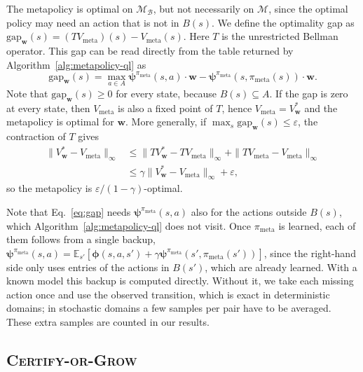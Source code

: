 \documentclass[11pt]{article}
\newcommand{\vphi}{\bm{\phi}}      %
\newcommand{\vpsi}{\bm{\psi}}      %
\begin{document}
The metapolicy is optimal on $\mathcal{M}_{\mathcal{B}}$, but not necessarily on $\mathcal{M}$, since the optimal policy may need an action that is not in $B(s)$. We define the optimality gap as $\mathrm{gap}_{\mathbf{w}}(s) = (T V_{\mathrm{meta}})(s) - V_{\mathrm{meta}}(s)$. Here $T$ is the unrestricted Bellman operator. This gap can be read directly from the table returned by Algorithm~\ref{alg:metapolicy-ql} as 
\begin{equation}\label{eq:gap}
    \mathrm{gap}_{\mathbf{w}}(s) = \max_{a \in A} \vpsi^{\pi_{\mathrm{meta}}}(s,a) \cdot \mathbf{w} - \vpsi^{\pi_{\mathrm{meta}}}(s, \pi_{\mathrm{meta}}(s)) \cdot \mathbf{w}.
\end{equation}
Note that $\mathrm{gap}_{\mathbf{w}}(s) \geq 0$ for every state, because $B(s) \subseteq A$. If the gap is zero at every state, then $V_{\mathrm{meta}}$ is also a fixed point of $T$, hence $V_{\mathrm{meta}} = V^*_{\mathbf{w}}$ and the metapolicy is optimal for $\mathbf{w}$. More generally, if $\max_s \mathrm{gap}_{\mathbf{w}}(s) \leq \varepsilon$, the contraction of $T$ gives
\begin{equation}\label{eq:certificate}
\begin{aligned}
    \| V^*_{\mathbf{w}} - V_{\mathrm{meta}} \|_\infty &\leq \| T V^*_{\mathbf{w}} - T V_{\mathrm{meta}} \|_\infty + \| T V_{\mathrm{meta}} - V_{\mathrm{meta}} \|_\infty \\
    &\leq \gamma \| V^*_{\mathbf{w}} - V_{\mathrm{meta}} \|_\infty + \varepsilon,
\end{aligned}
\end{equation}
so the metapolicy is $\varepsilon / (1-\gamma)$-optimal. 

Note that Eq.~\eqref{eq:gap} needs $\vpsi^{\pi_{\mathrm{meta}}}(s,a)$ also for the actions outside $B(s)$, which Algorithm~\ref{alg:metapolicy-ql} does not visit. Once $\pi_{\mathrm{meta}}$ is learned, each of them follows from a single backup, $\vpsi^{\pi_{\mathrm{meta}}}(s,a) = \mathbb{E}_{s'}\left[\vphi(s,a,s') + \gamma \vpsi^{\pi_{\mathrm{meta}}}(s', \pi_{\mathrm{meta}}(s'))\right]$, since the right-hand side only uses entries of the actions in $B(s')$, which are already learned. With a known model this backup is computed directly. Without it, we take each missing action once and use the observed transition, which is exact in deterministic domains; in stochastic domains a few samples per pair have to be averaged. These extra samples are counted in our results.

\subsection{\textsc{Certify-or-Grow}}
\end{document}
